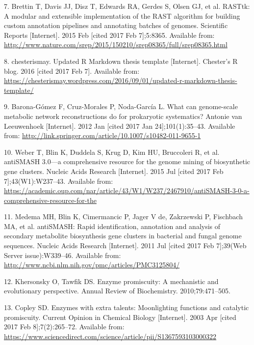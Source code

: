 \documentclass[12pt,twoside]{reedthesis}
\begin{document}
  \hypertarget{ref-brettin_rasttk:_2015}{}
  7. Brettin T, Davis JJ, Disz T, Edwards RA, Gerdes S, Olsen GJ, et al.
  RASTtk: A modular and extensible implementation of the RAST algorithm
  for building custom annotation pipelines and annotating batches of
  genomes. Scientific Reports {[}Internet{]}. 2015 Feb {[}cited 2017 Feb
  7{]};5:8365. Available from:
  \url{http://www.nature.com/srep/2015/150210/srep08365/full/srep08365.html}
  
  \hypertarget{ref-chesterismay_updated_2016}{}
  8. chesterismay. Updated R Markdown thesis template {[}Internet{]}.
  Chester's R blog. 2016 {[}cited 2017 Feb 7{]}. Available from:
  \url{https://chesterismay.wordpress.com/2016/09/01/updated-r-markdown-thesis-template/}
  
  \hypertarget{ref-barona-gomez_what_2012}{}
  9. Barona-Gómez F, Cruz-Morales P, Noda-García L. What can genome-scale
  metabolic network reconstructions do for prokaryotic systematics?
  Antonie van Leeuwenhoek {[}Internet{]}. 2012 Jan {[}cited 2017 Jan
  24{]};101(1):35--43. Available from:
  \url{http://link.springer.com/article/10.1007/s10482-011-9655-1}
  
  \hypertarget{ref-weber_antismash_2015}{}
  10. Weber T, Blin K, Duddela S, Krug D, Kim HU, Bruccoleri R, et al.
  antiSMASH 3.0---a comprehensive resource for the genome mining of
  biosynthetic gene clusters. Nucleic Acids Research {[}Internet{]}. 2015
  Jul {[}cited 2017 Feb 7{]};43(W1):W237--43. Available from:
  \url{https://academic.oup.com/nar/article/43/W1/W237/2467910/antiSMASH-3-0-a-comprehensive-resource-for-the}
  
  \hypertarget{ref-medema_antismash:_2011}{}
  11. Medema MH, Blin K, Cimermancic P, Jager V de, Zakrzewski P,
  Fischbach MA, et al. antiSMASH: Rapid identification, annotation and
  analysis of secondary metabolite biosynthesis gene clusters in bacterial
  and fungal genome sequences. Nucleic Acids Research {[}Internet{]}. 2011
  Jul {[}cited 2017 Feb 7{]};39(Web Server issue):W339--46. Available
  from: \url{http://www.ncbi.nlm.nih.gov/pmc/articles/PMC3125804/}
  
  \hypertarget{ref-khersonsky_enzyme_2010}{}
  12. Khersonsky O, Tawfik DS. Enzyme promiscuity: A mechanistic and
  evolutionary perspective. Annual Review of Biochemistry.
  2010;79:471--505.
  
  \hypertarget{ref-copley_enzymes_2003}{}
  13. Copley SD. Enzymes with extra talents: Moonlighting functions and
  catalytic promiscuity. Current Opinion in Chemical Biology
  {[}Internet{]}. 2003 Apr {[}cited 2017 Feb 8{]};7(2):265--72. Available
  from:
  \url{https://www.sciencedirect.com/science/article/pii/S1367593103000322}
  
\end{document}
